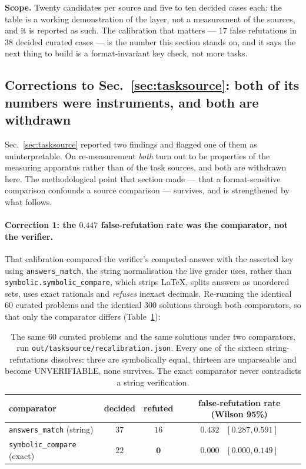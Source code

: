 \textbf{Scope.} Twenty candidates per source and five to ten decided cases each: the table is
a working demonstration of the layer, not a measurement of the sources, and it is reported as
such. The calibration that matters --- $17$ false refutations in $38$ decided curated
cases --- is the number this section stands on, and it says the next thing to build is a
format-invariant key check, not more tasks.

\subsection{Corrections to Sec.~\ref{sec:tasksource}: both of its numbers were instruments,
and both are withdrawn}
\label{sec:tasksourcecorr}

Sec.~\ref{sec:tasksource} reported two findings and flagged one of them as uninterpretable.
On re-measurement \emph{both} turn out to be properties of the measuring apparatus rather than
of the task sources, and both are withdrawn here. The methodological point that section made
--- that a format-sensitive comparison confounds a source comparison --- survives, and is
strengthened by what follows.

\paragraph{Correction 1: the $0.447$ false-refutation rate was the comparator, not the
verifier.} That calibration compared the verifier's computed answer with the asserted key
using \texttt{answers\_match}, the string normalisation the live grader uses, rather than
\texttt{symbolic.symbolic\_compare}, which strips \LaTeX{}, splits answers as unordered sets,
uses exact rationals and \emph{refuses} inexact decimals. Re-running the identical $60$ curated
problems and the identical $300$ solutions through both comparators, so that only the
comparator differs (Table~\ref{tab:comparator}):

\begin{table}[t]
\centering\small
\caption{The same 60 curated problems and the same solutions under two comparators, run
\texttt{out/tasksource/recalibration.json}. Every one of the sixteen string-refutations
dissolves: three are symbolically equal, thirteen are unparseable and become UNVERIFIABLE,
none survives. The exact comparator never contradicts a string verification.}
\label{tab:comparator}
\begin{tabular}{lccc}
\toprule
comparator & decided & refuted & false-refutation rate (Wilson 95\%) \\
\midrule
\texttt{answers\_match} (string) & $37$ & $16$ & $0.432$ \ $[0.287, 0.591]$ \\
\texttt{symbolic\_compare} (exact) & $22$ & $\mathbf{0}$ & $\mathbf{0.000}$ \ $[0.000, 0.149]$ \\
\bottomrule
\end{tabular}
\end{table}

